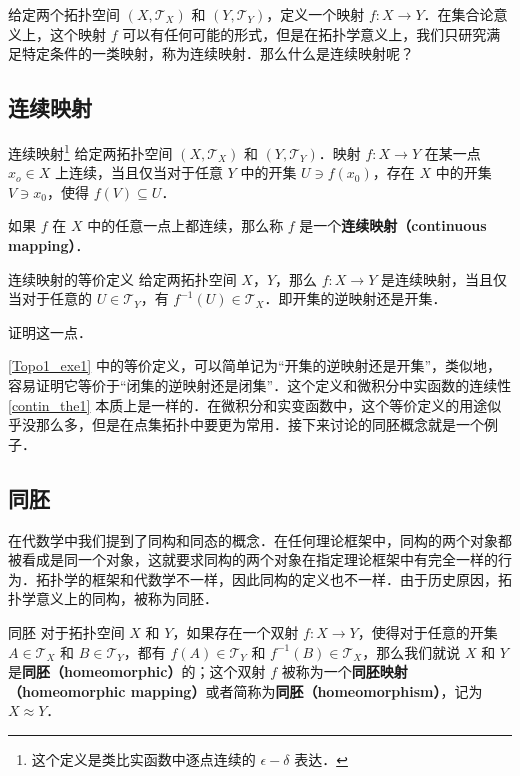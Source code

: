 

给定两个拓扑空间 $(X, \mathcal{T}_X)$ 和 $(Y, \mathcal{T}_Y)$，定义一个映射 $f:X\rightarrow Y$．在集合论意义上，这个映射 $f$ 可以有任何可能的形式，但是在拓扑学意义上，我们只研究满足特定条件的一类映射，称为连续映射．那么什么是连续映射呢？

\subsection{连续映射}
\begin{definition}{连续映射\footnote{这个定义是类比实函数中逐点连续的 $\epsilon-\delta$ 表达．}}
给定两拓扑空间 $(X, \mathcal{T}_X)$ 和 $(Y, \mathcal{T}_Y)$．映射 $f:X\rightarrow Y$ 在某一点 $x_o\in X$ 上连续，当且仅当对于任意 $Y$ 中的开集 $U\ni f(x_0)$，存在 $X$ 中的开集 $V\ni x_0$，使得 $f(V)\subseteq U$．

如果 $f$ 在 $X$ 中的任意一点上都连续，那么称 $f$ 是一个\textbf{连续映射（continuous mapping）}．
\end{definition}

\begin{exercise}{连续映射的等价定义}\label{Topo1_exe1}
给定两拓扑空间 $X$，$Y$，那么 $f:X\rightarrow Y$ 是连续映射，当且仅当对于任意的 $U\in\mathcal{T}_Y$，有 $f^{-1}(U)\in\mathcal{T}_X$．即开集的逆映射还是开集．

证明这一点．
\end{exercise}

\autoref{Topo1_exe1} 中的等价定义，可以简单记为“开集的逆映射还是开集”，类似地，容易证明它等价于“闭集的逆映射还是闭集”．这个定义和微积分中实函数的连续性\autoref{contin_the1} 本质上是一样的．在微积分和实变函数中，这个等价定义的用途似乎没那么多，但是在点集拓扑中要更为常用．接下来讨论的同胚概念就是一个例子．

\subsection{同胚}

在代数学中我们提到了同构和同态的概念．在任何理论框架中，同构的两个对象都被看成是同一个对象，这就要求同构的两个对象在指定理论框架中有完全一样的行为．拓扑学的框架和代数学不一样，因此同构的定义也不一样．由于历史原因，拓扑学意义上的同构，被称为同胚．

\begin{definition}{同胚}
对于拓扑空间 $X$ 和 $Y$，如果存在一个双射 $f:X\rightarrow Y$，使得对于任意的开集 $A\in\mathcal{T}_X$ 和 $B\in\mathcal{T}_Y$，都有 $f(A)\in\mathcal{T}_Y$ 和 $f^{-1}(B)\in\mathcal{T}_X$，那么我们就说 $X$ 和 $Y$ 是\textbf{同胚（homeomorphic）}的；这个双射 $f$ 被称为一个\textbf{同胚映射（homeomorphic mapping）}或者简称为\textbf{同胚（homeomorphism）}，记为 $X\approx Y$．
\end{definition}

